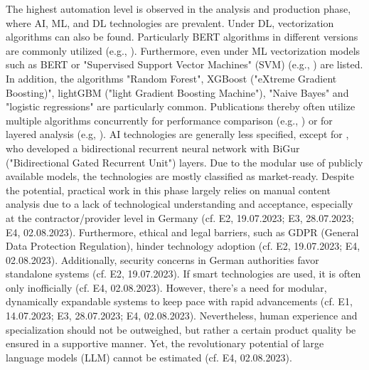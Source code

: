 \documentclass[10pt]{article}
\begin{document}
The highest automation level is observed in the analysis and production phase, where AI, ML, and DL technologies are prevalent.
Under DL, vectorization algorithms can also be found. Particularly BERT algorithms in different versions are commonly utilized
(e.g., \cite{Ma.2022}). Furthermore, even under ML vectorization models such as BERT or
"Supervised Support Vector Machines" (SVM) (e.g., \cite{Iorga.2020}) are listed.
In addition, the algorithms "Random Forest", XGBoost ("eXtreme Gradient Boosting)",
lightGBM ("light Gradient Boosting Machine"), "Naive Bayes" and "logistic regressions" are particularly common.
Publications thereby often utilize multiple algorithms concurrently for performance comparison (e.g., \cite{Tao.2023})
or for layered analysis (e.g, \cite{Yang.2022}). AI technologies are generally less specified,
except for \cite{Dale.2023}, who developed a bidirectional recurrent neural network with
BiGur ("Bidirectional Gated Recurrent Unit") layers. Due to the modular use of publicly available models,
the technologies are mostly classified as market-ready. Despite the potential, practical work in this phase
largely relies on manual content analysis due to a lack of technological understanding and acceptance,
especially at the contractor/provider level in Germany (cf. E2, 19.07.2023; E3, 28.07.2023; E4, 02.08.2023). Furthermore,
ethical and legal barriers, such as GDPR (General Data Protection Regulation), hinder technology adoption
(cf. E2, 19.07.2023; E4, 02.08.2023). Additionally, security concerns in German authorities favor
standalone systems (cf. E2, 19.07.2023). If smart technologies are used, it is often only inofficially
(cf. E4, 02.08.2023). However, there's a need for modular, dynamically expandable
systems to keep pace with rapid advancements (cf. E1, 14.07.2023; E3, 28.07.2023; E4, 02.08.2023).
Nevertheless, human experience and specialization should not be outweighed, but rather a certain product quality
be ensured in a supportive manner. Yet, the revolutionary potential of large language models (LLM) cannot be estimated (cf. E4, 02.08.2023).
\end{document}

